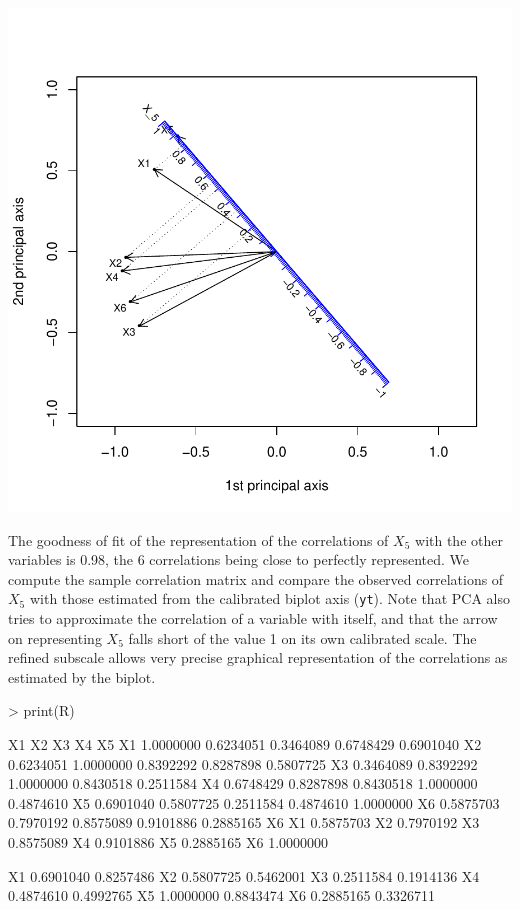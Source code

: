 \documentclass[a4paper]{article}
\begin{document}
\includegraphics{CalibrationGuide-012}

The goodness of fit of the representation of the correlations of $X_5$ with the
other variables is 0.98, the 6 correlations being close to perfectly represented.
We compute the sample correlation matrix and compare the observed correlations of 
$X_5$ with those estimated from the calibrated biplot axis ({\tt yt}). Note that
PCA also tries to approximate the correlation of a variable with itself, and that
the arrow on representing $X_5$ falls short of the value 1 on its own calibrated scale.
The refined subscale allows very precise graphical representation of the correlations
as estimated by the biplot.

\begin{center}
\begin{Schunk}
\begin{Sinput}
> print(R)
\end{Sinput}
\begin{Soutput}
          X1        X2        X3        X4        X5
X1 1.0000000 0.6234051 0.3464089 0.6748429 0.6901040
X2 0.6234051 1.0000000 0.8392292 0.8287898 0.5807725
X3 0.3464089 0.8392292 1.0000000 0.8430518 0.2511584
X4 0.6748429 0.8287898 0.8430518 1.0000000 0.4874610
X5 0.6901040 0.5807725 0.2511584 0.4874610 1.0000000
X6 0.5875703 0.7970192 0.8575089 0.9101886 0.2885165
          X6
X1 0.5875703
X2 0.7970192
X3 0.8575089
X4 0.9101886
X5 0.2885165
X6 1.0000000
\end{Soutput}
\begin{Soutput}
        [,1]      [,2]
X1 0.6901040 0.8257486
X2 0.5807725 0.5462001
X3 0.2511584 0.1914136
X4 0.4874610 0.4992765
X5 1.0000000 0.8843474
X6 0.2885165 0.3326711
\end{Soutput}
\end{Schunk}
\end{center}
\end{document}
